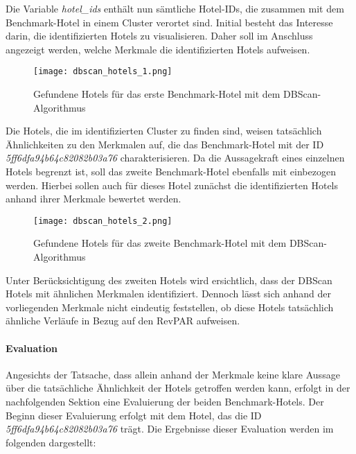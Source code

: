 Die Variable \emph{hotel\_ids} enthält nun sämtliche Hotel-IDs, die zusammen mit dem Benchmark-Hotel in einem Cluster verortet sind. Initial besteht das Interesse darin, die identifizierten Hotels zu visualisieren. Daher soll im Anschluss angezeigt werden, welche Merkmale die identifizierten Hotels aufweisen.

\begin{figure}[h]
    \centering
    \texttt{[image: dbscan\_hotels\_1.png]}
    \caption[Gefundene Hotels für das erste Benchmark-Hotel mit dem DBScan-Algorithmus]{Gefundene Hotels für das erste Benchmark-Hotel mit dem DBScan-Algorithmus}
    \label{img:dbscan_hotels_1}
\end{figure}

Die Hotels, die im identifizierten Cluster zu finden sind, weisen tatsächlich Ähnlichkeiten zu den Merkmalen auf, die das Benchmark-Hotel mit der ID \emph{5ff6dfa94b64c82082b03a76} charakterisieren. Da die Aussagekraft eines einzelnen Hotels begrenzt ist, soll das zweite Benchmark-Hotel ebenfalls mit einbezogen werden. Hierbei sollen auch für dieses Hotel zunächst die identifizierten Hotels anhand ihrer Merkmale bewertet werden.

\begin{figure}[h]
    \centering
    \texttt{[image: dbscan\_hotels\_2.png]}
    \caption[Gefundene Hotels für das zweite Benchmark-Hotel mit dem DBScan-Algorithmus]{Gefundene Hotels für das zweite Benchmark-Hotel mit dem DBScan-Algorithmus}
    \label{img:dbscan_hotels_2}
\end{figure}

Unter Berücksichtigung des zweiten Hotels wird ersichtlich, dass der DBScan Hotels mit ähnlichen Merkmalen identifiziert. Dennoch lässt sich anhand der vorliegenden Merkmale nicht eindeutig feststellen, ob diese Hotels tatsächlich ähnliche Verläufe in Bezug auf den RevPAR aufweisen.

\paragraph{Evaluation}
Angesichts der Tatsache, dass allein anhand der Merkmale keine klare Aussage über die tatsächliche Ähnlichkeit der Hotels getroffen werden kann, erfolgt in der nachfolgenden Sektion eine Evaluierung der beiden Benchmark-Hotels. 
\newline
\newline
Der Beginn dieser Evaluierung erfolgt mit dem Hotel, das die ID \emph{5ff6dfa94b64c82082b03a76} trägt. Die Ergebnisse dieser Evaluation werden im folgenden dargestellt:

